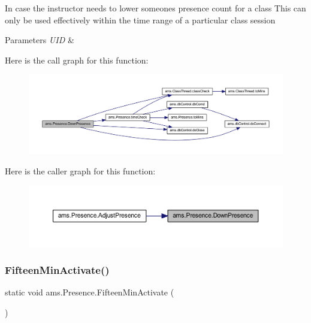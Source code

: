 In case the instructor needs to lower someone\textquotesingle{}s presence count for a class This can only be used effectively within the time range of a particular class session 
\begin{DoxyParams}{Parameters}
{\em U\+ID} & \\
\hline
\end{DoxyParams}
Here is the call graph for this function\+:\nopagebreak
\begin{figure}[H]
\begin{center}
\leavevmode
\includegraphics[width=350pt]{classams_1_1_presence_a1b05700a39e8cadcba0c749d296a04f8_cgraph}
\end{center}
\end{figure}
Here is the caller graph for this function\+:\nopagebreak
\begin{figure}[H]
\begin{center}
\leavevmode
\includegraphics[width=350pt]{classams_1_1_presence_a1b05700a39e8cadcba0c749d296a04f8_icgraph}
\end{center}
\end{figure}
\mbox{\label{classams_1_1_presence_a84efc9c047a0a2259f61cf55356c9701}} 
\subsubsection{\texorpdfstring{FifteenMinActivate()}{FifteenMinActivate()}}
{\footnotesize\ttfamily static void ams.\+Presence.\+Fifteen\+Min\+Activate (\begin{DoxyParamCaption}{ }\end{DoxyParamCaption})\hspace{0.3cm}{\ttfamily [static]}}


